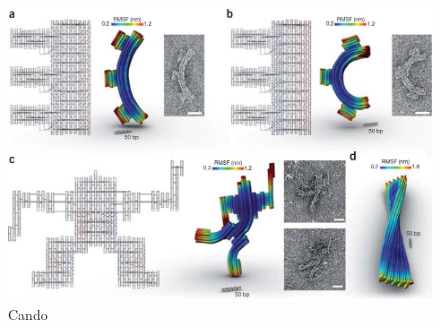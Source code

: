 \begin{figure}[h]
  \begin{center}
    \includegraphics[width=\textwidth]{figures/cando.png}
    \caption{Cando}
    \label{fig:cando}
  \end{center}
\end{figure}